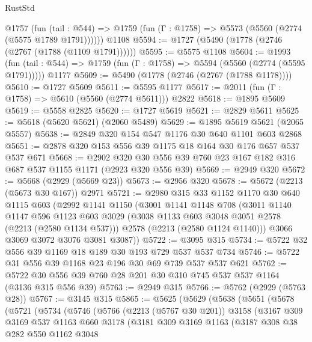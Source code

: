 \begin{lexlean}{RustStd}
\begin{coremodule}
    @1757
      (fun (tail : @544) => @1759 (fun (Γ : @1758) => @5573 (@5560 (@2774 (@5575 @1789 @1791))))))
    @1108
@5594 := @1727 (@5490 (@1778 (@2746 (@2767 (@1788 (@1109 @1791))))))
@5595 := @5575 @1108
@5604 := @1993
    (fun (tail : @544) => @1759 (fun (Γ : @1758) => @5594 (@5560 (@2774 (@5595 @1791)))))
    @1177
@5609 := @5490 (@1778 (@2746 (@2767 (@1788 @1178))))
@5610 := @1727 @5609
@5611 := @5595 @1177
@5617 := @2011 (fun (Γ : @1758) => @5610 (@5560 (@2774 @5611))) @2822
@5618 := @1895 @5609
@5619 := @5558 @2825
@5620 := @1727 @5619
@5621 := @2829 @5611
@5625 := @5618 (@5620 @5621) (@2060 @5489)
@5629 := @1895 @5619 @5621 (@2065 @5557)
@5638 := @2849 @320 @154 @547 @1176 @30 @640 @1101 @603 @2868
@5651 := @2878 @320 @153 @556 @39 @1175 @18 @164 @30 @176 @657 @537 @537 @671
@5668 := @2902 @320 @30 @556 @39 @760 @23 @167 @182 @316 @687 @537 @1155 @1171 (@2923 @320 @556 @39)
@5669 := @2949 @320
@5672 := @5668 (@2929 (@5669 @23))
@5673 := @2956 @320
@5678 := @5672 (@2213 (@5673 @30 @167)) @2971
@5721 := @2980
    @315
    @33
    @1152
    @1170
    @30
    @640
    @1115
    @603
    (@2992
      @1141
      @1150
      (@3001
        @1141
        @1148
        @708
        (@3011
          @1140
          @1147
          @596
          @1123
          @603
          @3029
          (@3038 @1133 @603 @3048 @3051 @2578 (@2213 (@2580 @1134 @537)))
          @2578
          (@2213 (@2580 @1124 @1140)))
        @3066
        @3069
        @3072
        @3076
        @3081
        @3087))
@5722 := @3095 @315
@5734 := @5722 @32 @556 @39 @1169 @18 @189 @30 @193 @729 @537 @537 @734
@5746 := @5722 @31 @556 @39 @1168 @23 @196 @30 @69 @739 @537 @537 @621
@5762 := @5722 @30 @556 @39 @760 @28 @201 @30 @310 @745 @537 @537 @1164 (@3136 @315 @556 @39)
@5763 := @2949 @315
@5766 := @5762 (@2929 (@5763 @28))
@5767 := @3145 @315
@5865 := @5625
    (@5629
      (@5638
        (@5651
          (@5678
            (@5721
              (@5734
                (@5746
                  (@5766
                    (@2213 (@5767 @30 @201))
                    @3158
                    (@3167
                      @309
                      @3169
                      @537
                      @1163
                      @660
                      @3178
                      (@3181
                        @309
                        @3169
                        @1163
                        (@3187
                          @308
                          @38
                          @282
                          @550
                          @1162
                          @3048

\end{coremodule}
\end{lexlean}
